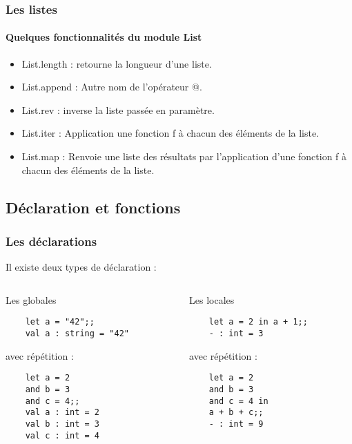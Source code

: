 \begin{frame}[fragile]
	\frametitle{Les listes}
	\framesubtitle{Quelques fonctionnalités du module List}
	\begin{itemize}
	
	\item List.length : retourne la longueur d'une liste.	
	
	\item List.append : Autre nom de l'opérateur @.
	
	\item List.rev : inverse la liste passée en paramètre.
	
	\item List.iter : Application une fonction f à chacun des éléments de la liste.

	\item List.map : Renvoie une liste des résultats par l'application d'une fonction f à chacun des éléments de la liste.

	\end{itemize}
\end{frame}


\subsection{Déclaration et fonctions} %
\begin{frame}[fragile]
      \frametitle{Les déclarations}
      Il existe deux types de déclaration :
	\begin{columns}[t]
		\begin{column}{5cm}
		\begin{block}{Les globales}
		\begin{lstlisting}
	let a = "42";;
	val a : string = "42"
	\end{lstlisting}
	avec répétition :
	\begin{lstlisting}
	let a = 2
	and b = 3
	and c = 4;;
	val a : int = 2
	val b : int = 3
	val c : int = 4
		\end{lstlisting}
		\end{block}
		\end{column}
      		\begin{column}{5cm}
		\begin{block}{Les locales}
		\begin{lstlisting}
	let a = 2 in a + 1;;
	- : int = 3
	\end{lstlisting}
	avec répétition :
	\begin{lstlisting}
	let a = 2
	and b = 3
	and c = 4 in
	a + b + c;;
	- : int = 9
		\end{lstlisting}
		\end{block}
      		\end{column}
	\end{columns}
\end{frame}

